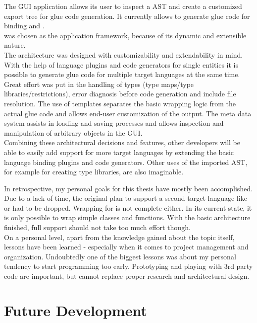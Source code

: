 The  GUI application allows its user to inspect a  AST and create a customized export tree for glue code generation. It currently allows to generate glue code for binding  and .\\
 was chosen as the application framework, because of its dynamic and extensible nature.\\
The architecture was designed with customizability and extendability in mind. With the help of language plugins and code generators for single  entities it is possible to generate glue code for multiple target languages at the same time. Great effort was put in the handling of types (type maps/type libraries/restrictions), error diagnosis before code generation and include file resolution. The use of templates separates the basic wrapping logic from the actual glue code and allows end-user customization of the output. The meta data system assists in loading and saving processes and allows inspection and manipulation of arbitrary  objects in the GUI.\\
Combining these architectural decisions and features, other developers will be able to easily add support for more target languages by extending the basic language binding plugins and code generators. Other uses of the imported  AST, for example for creating type libraries, are also imaginable.

In retrospective, my personal goals for this thesis have mostly been accomplished.\\
Due to a lack of time, the original plan to support a second target language like  or  had to be dropped. Wrapping for  is not complete either. In its current state, it is only possible to wrap simple classes and functions. With the basic architecture finished, full support should not take too much effort though.\\
On a personal level, apart from the knowledge gained about the topic itself, lessons have been learned - especially when it comes to project management and organization. Undoubtedly one of the biggest lessons was about my personal tendency to start programming too early. Prototyping and playing with 3rd party code are important, but cannot replace proper research and architectural design.

\chapter{Future Development}
\label{chap:FutureDevelopment}

